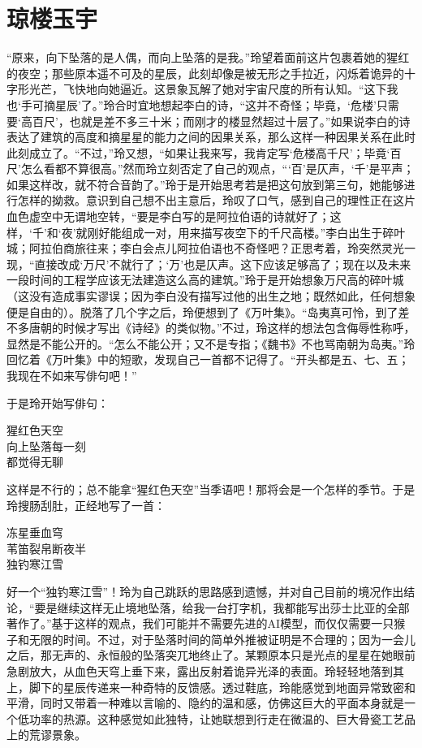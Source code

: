 \chapter{琼楼玉宇}

“原来，向下坠落的是人偶，而向上坠落的是我。”玲望着面前这片包裹着她的猩红的夜空；那些原本遥不可及的星辰，此刻却像是被无形之手拉近，闪烁着诡异的十字形光芒，飞快地向她逼近。这景象瓦解了她对宇宙尺度的所有认知。“这下我也‘手可摘星辰’了。”玲合时宜地想起李白的诗，“这并不奇怪；毕竟，‘危楼’只需要‘高百尺’，也就是差不多三十米；而刚才的楼显然超过十层了。”如果说李白的诗表达了建筑的高度和摘星星的能力之间的因果关系，那么这样一种因果关系在此时此刻成立了。“不过，”玲又想，“如果让我来写，我肯定写‘危楼高千尺’；毕竟‘百尺’怎么看都不算很高。”然而玲立刻否定了自己的观点，“‘百’是仄声，‘千’是平声；如果这样改，就不符合音韵了。”玲于是开始思考若是把这句放到第三句，她能够进行怎样的拗救。意识到自己想不出主意后，玲叹了口气，感到自己的理性正在这片血色虚空中无谓地空转，“要是李白写的是阿拉伯语的诗就好了；这样，‘千’和‘夜’就刚好能组成一对，用来描写夜空下的千尺高楼。”李白出生于碎叶城；阿拉伯商旅往来；李白会点儿阿拉伯语也不奇怪吧？正思考着，玲突然灵光一现，“直接改成‘万尺’不就行了；‘万’也是仄声。这下应该足够高了；现在以及未来一段时间的工程学应该无法建造这么高的建筑。”玲于是开始想象万尺高的碎叶城（这没有造成事实谬误；因为李白没有描写过他的出生之地；既然如此，任何想象便是自由的）。脱落了几个字之后，玲便想到了《万叶集》。“岛夷真可怜，到了差不多唐朝的时候才写出《诗经》的类似物。”不过，玲这样的想法包含侮辱性称呼，显然是不能公开的。“怎么不能公开；又不是专指；《魏书》不也骂南朝为岛夷。”玲回忆着《万叶集》中的短歌，发现自己一首都不记得了。“开头都是五、七、五；我现在不如来写俳句吧！”

于是玲开始写俳句：
\begin{song}
猩红色天空\\
向上坠落每一刻\\
都觉得无聊
\end{song}

这样是不行的；总不能拿“猩红色天空”当季语吧！那将会是一个怎样的季节。于是玲搜肠刮肚，正经地写了一首：
\begin{song}
冻星垂血穹\\
苇笛裂帛断夜半\\
独钓寒江雪
\end{song}

好一个“独钓寒江雪”！玲为自己跳跃的思路感到遗憾，并对自己目前的境况作出结论，“要是继续这样无止境地坠落，给我一台打字机，我都能写出莎士比亚的全部著作了。”基于这样的观点，我们可能并不需要先进的AI模型，而仅仅需要一只猴子和无限的时间。不过，对于坠落时间的简单外推被证明是不合理的；因为一会儿之后，那无声的、永恒般的坠落突兀地终止了。某颗原本只是光点的星星在她眼前急剧放大，从血色天穹上垂下来，露出反射着诡异光泽的表面。玲轻轻地落到其上，脚下的星辰传递来一种奇特的反馈感。透过鞋底，玲能感觉到地面异常致密和平滑，同时又带着一种难以言喻的、隐约的温和感，仿佛这巨大的平面本身就是一个低功率的热源。这种感觉如此独特，让她联想到行走在微温的、巨大骨瓷工艺品上的荒谬景象。

